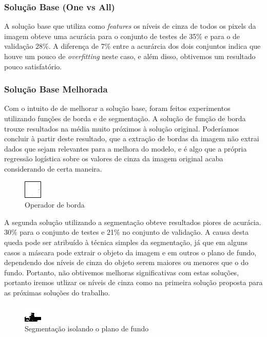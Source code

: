 \documentclass[conference]{IEEEtran}
\begin{document}
\subsubsection{Solução Base (One vs All)}
A solução base que utiliza como \textit{features} os níveis de cinza de todos os pixels da imagem obteve uma acurácia para o conjunto de testes de 35\% e para o de validação 28\%. A diferença de 7\% entre a acurárcia dos dois conjuntos indica que houve um pouco de \textit{overfitting} neste caso, e além disso, obtivemos um resultado pouco satisfatório.

\subsubsection{Solução Base Melhorada}
Com o intuito de de melhorar a solução base, foram feitos experimentos utilizando funções de borda e de segmentação. A solução de função de borda trouxe resultados na média muito próximos à solução original. Poderíamos concluir à partir deste resultado, que a extração de bordas da imagem não extrai dados que sejam relevantes para a melhora do modelo, e é algo que a própria regressão logística sobre os valores de cinza da imagem original acaba considerando de certa maneira.

\begin{figure}[H]
  \includegraphics[center]{bor.png}
  \caption{Operador de borda}
  \label{fig:frog1}
\end{figure}

A segunda solução utilizando a segmentação obteve resultados piores de acurácia. 30\% para o conjunto de testes e 21\% no conjunto de validação. A causa desta queda pode ser atribuído à técnica simples da segmentação, já que em alguns casos a máscara pode extrair o objeto da imagem e em outros o plano de fundo, dependendo dos níveis de cinza do objeto serem maiores ou menores que o do fundo. Portanto, não obtivemos melhoras significativas com estas soluções, portanto iremos utlizar os níveis de cinza como na primeira solução proposta para as próximas soluções do trabalho.

\begin{figure}[H]
  \includegraphics[center]{seg1.png}
  \caption{Segmentação isolando o plano de fundo}
  \label{fig:boat1}
\end{figure}
\end{document}
